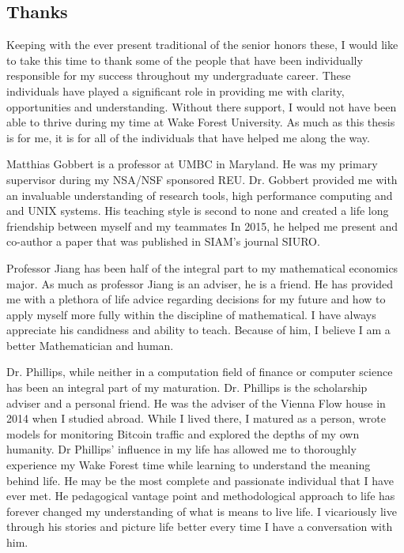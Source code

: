 \documentclass[paper=letter, fontsize=11pt]{scrartcl}
\numberwithin{equation}{section}		%
\numberwithin{figure}{section}			%
\numberwithin{table}{section}				%
\begin{document}
\pagebreak
\begin{spacing}{2}
\section*{Thanks}
Keeping with the ever present traditional of the senior honors these, I would like to take this time to thank some of the people that have been individually responsible for my success throughout my undergraduate career. These individuals have played a significant role in  providing me with clarity, opportunities and understanding. Without there support, I would not have been able to thrive during my time at Wake Forest University. As much as this thesis is for me, it is for all of the individuals that have helped me along the way. 

Matthias Gobbert is a professor at UMBC in Maryland. He was my primary supervisor during my NSA/NSF sponsored REU. Dr. Gobbert provided me with an invaluable understanding of research tools, high performance computing and and UNIX systems. His teaching style is second to none and created a life long friendship between myself and my teammates In 2015, he helped me present and co-author a paper that was published in SIAM's journal SIURO. 

Professor Jiang has been half of the integral part to my mathematical economics major. As much as professor Jiang is an adviser, he is a friend. He has provided me with a plethora of life advice regarding decisions for my future and how to apply myself more fully within the discipline of mathematical. I have always appreciate his candidness and ability to teach. Because of him, I believe I am a better Mathematician and human. 

Dr. Phillips, while neither in a computation field of finance or computer science has been an integral part of my maturation. Dr. Phillips is the scholarship adviser and a personal friend. He was the adviser of the Vienna Flow house in 2014 when I studied abroad. While I lived there, I matured as a person, wrote models for monitoring Bitcoin traffic and explored the depths of my own humanity. Dr Phillips' influence in my life has allowed me to thoroughly experience my Wake Forest time while learning to understand the meaning behind life. He may be the most complete and passionate individual that I have ever met. He pedagogical vantage point and methodological approach to life has forever changed my understanding of what is means to live life. I vicariously live through his stories and picture life better every time I have a conversation with him.


\end{spacing}
\end{document}

